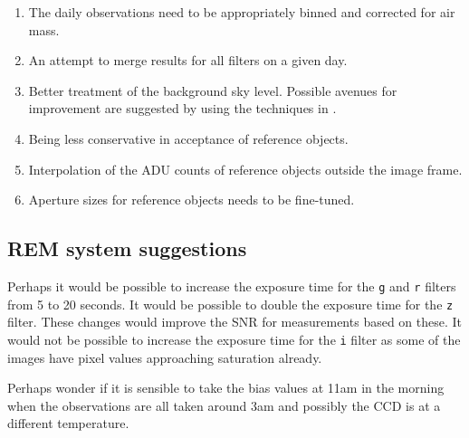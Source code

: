 \begin{enumerate}
  \item The daily observations need to be appropriately binned and corrected for
  air mass.
  \item An attempt to merge results for all filters on a given day.
  \item Better treatment of the background sky level. Possible avenues for improvement are suggested by using the
      techniques in \citet{dubovsky17}.
  \item Being less conservative in acceptance of reference objects.
  \item Interpolation of the ADU counts of reference objects outside the image
  frame.
  \item Aperture sizes for reference objects needs to be fine-tuned.
\end{enumerate}

\subsection{REM system suggestions}
\protect\label{section:remimprove}

Perhaps it would be possible to increase the exposure time for the \texttt{g}
and \texttt{r} filters from 5 to 20 seconds. It would be possible to double the
exposure time for the \texttt{z} filter. These changes would improve the SNR for
measurements based on these. It would not be possible to increase the exposure
time for the \texttt{i} filter as some of the images have pixel values
approaching saturation already.

Perhaps wonder if it is sensible to take the bias values at 11am in the morning
when the observations are all taken around 3am and possibly the CCD is at a different
temperature.

